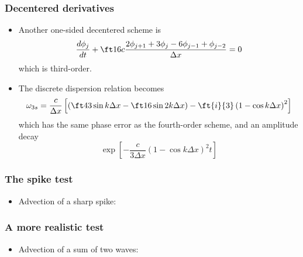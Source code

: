 \documentclass[aspectratio=43,9pt]{beamer}
\begin{document}
\begin{frame}
	\frametitle{Decentered derivatives}
	\vfill\begin{itemize}
		\item Another one-sided decentered scheme is 
			\begin{equation*}
				\frac{d \phi_j}{dt} + \ft16 c \frac{2 \phi_{j+1} + 3 \phi_j - 6 \phi_{j-1} + \phi_{j-2}}{\Delta x} = 0
			\end{equation*}
			which is third-order.\vfill
		\item The discrete dispersion relation becomes
			\begin{equation*}
				\omega_{3s} = \frac{c}{\Delta x} \left[ \left( \ft43 \sin k \Delta x - \ft16 \sin 2 k \Delta x \right)
					- \ft{i}{3} \left( 1 - \cos k \Delta x	\right)^2 \right]
			\end{equation*}
			which has the same phase error as the fourth-order scheme, and an amplitude decay
			\begin{equation*}
				\exp \left[ - \frac{c}{3\Delta x} \left( 1 - \cos k \Delta x \right)^2 t \right]
			\end{equation*}
	\end{itemize}\vfill
\end{frame}
%
%
\begin{frame}
	\frametitle{The spike test}
	\vfill\begin{itemize}
		\item Advection of a sharp spike:
			\begin{center}
				\scalebox{.8}{}
			\end{center}
	\end{itemize}\vfill
\end{frame}
%
%
\begin{frame}
	\frametitle{A more realistic test}
	\vfill\begin{itemize}
		\item Advection of a sum of two waves:
			\begin{center}
				\scalebox{.8}{}
			\end{center}
	\end{itemize}\vfill
\end{frame}
%
%
\end{document}
